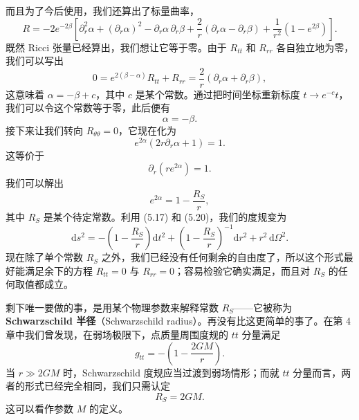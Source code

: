 而且为了今后使用，我们还算出了标量曲率，
\begin{equation*}
R = -2e^{-2\beta}\left[\partial_r^2\alpha + (\partial_r\alpha)^2 - \partial_r\alpha\,\partial_r\beta + \frac{2}{r}(\partial_r\alpha - \partial_r\beta) + \frac{1}{r^2}\left(1 - e^{2\beta}\right)\right].
\tag{5.15}
\end{equation*}
既然 Ricci 张量已经算出，我们想让它等于零。由于 $R_{tt}$ 和 $R_{rr}$ 各自独立地为零，我们可以写出
\begin{equation*}
0 = e^{2(\beta-\alpha)}R_{tt} + R_{rr} = \frac{2}{r}(\partial_r\alpha + \partial_r\beta),
\tag{5.16}
\end{equation*}
这意味着 $\alpha = -\beta + c$，其中 $c$ 是某个常数。通过把时间坐标重新标度 $t \to e^{-c}t$，我们可以令这个常数等于零，此后便有
\begin{equation*}
\alpha = -\beta.
\tag{5.17}
\end{equation*}
接下来让我们转向 $R_{\theta\theta} = 0$，它现在化为
\begin{equation*}
e^{2\alpha}(2r\partial_r\alpha + 1) = 1.
\tag{5.18}
\end{equation*}
这等价于
\begin{equation*}
\partial_r\left(re^{2\alpha}\right) = 1.
\tag{5.19}
\end{equation*}
我们可以解出
\begin{equation*}
e^{2\alpha} = 1 - \frac{R_S}{r},
\tag{5.20}
\end{equation*}
其中 $R_S$ 是某个待定常数。利用 (5.17) 和 (5.20)，我们的度规变为
\begin{equation*}
\mathrm{d}s^2 = -\left(1 - \frac{R_S}{r}\right)\mathrm{d}t^2 + \left(1 - \frac{R_S}{r}\right)^{-1}\mathrm{d}r^2 + r^2\,\mathrm{d}\Omega^2.
\tag{5.21}
\end{equation*}
现在除了单个常数 $R_S$ 之外，我们已经没有任何剩余的自由度了，所以这个形式最好能满足余下的方程 $R_{tt} = 0$ 与 $R_{rr} = 0$；容易检验它确实满足，而且对 $R_S$ 的任何取值都成立。

剩下唯一要做的事，是用某个物理参数来解释常数 $R_S$——它被称为 \textbf{Schwarzschild 半径}（Schwarzschild radius）。再没有比这更简单的事了。在第 4 章中我们曾发现，在弱场极限下，点质量周围度规的 $tt$ 分量满足
\begin{equation*}
g_{tt} = -\left(1 - \frac{2GM}{r}\right).
\tag{5.22}
\end{equation*}
当 $r \gg 2GM$ 时，Schwarzschild 度规应当过渡到弱场情形；而就 $tt$ 分量而言，两者的形式已经完全相同，我们只需认定
\begin{equation*}
R_S = 2GM.
\tag{5.23}
\end{equation*}
这可以看作参数 $M$ 的定义。

